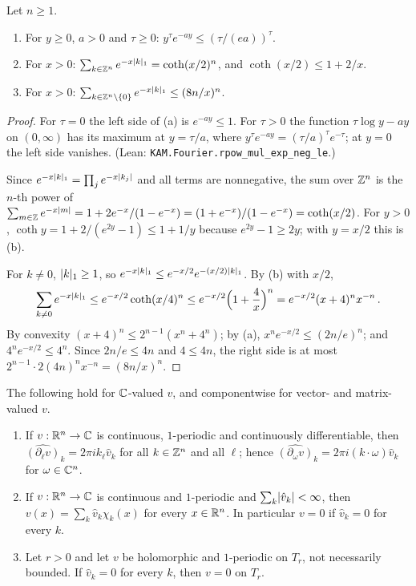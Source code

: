 \begin{lemma}\label{bp:p1:exp-sums}
Let $n\ge1$.
\begin{enumerate}[label=(\alph*)]
\item For $y\ge0$, $a>0$ and $\tau\ge0$: $y^\tau e^{-ay}\le(\tau/(ea))^\tau$.
\item For $x>0$: $\sum_{k\in\mathbb{Z}^n}e^{-x\lvert k\rvert_1}=\coth(x/2)^n$, and $\coth(x/2)\le1+2/x$.
\item For $x>0$: $\sum_{k\in\mathbb{Z}^n\setminus\{0\}}e^{-x\lvert k\rvert_1}\le(8n/x)^n$.
\end{enumerate}
\end{lemma}

\begin{proof}
\label{step:p1:es-power}
For $\tau=0$ the left side of (a) is $e^{-ay}\le1$. For $\tau>0$ the function $\tau\log y-ay$ on
$(0,\infty)$ has its maximum at $y=\tau/a$, where $y^\tau e^{-ay}=(\tau/a)^\tau e^{-\tau}$; at $y=0$ the left
side vanishes. (Lean: \nolinkurl{KAM.Fourier.rpow_mul_exp_neg_le}.)

\label{step:p1:es-product}
Since $e^{-x\lvert k\rvert_1}=\prod_je^{-x\lvert k_j\rvert}$ and all terms are nonnegative, the sum over $\mathbb{Z}^n$ is the
$n$-th power of $\sum_{m\in\mathbb{Z}}e^{-x\lvert m\rvert}=1+2e^{-x}/(1-e^{-x})=(1+e^{-x})/(1-e^{-x})=\coth(x/2)$.
For $y>0$, $\coth y=1+2/(e^{2y}-1)\le1+1/y$ because $e^{2y}-1\ge2y$; with $y=x/2$ this is (b).

\label{step:p1:es-nonzero}
For $k\ne0$, $\lvert k\rvert_1\ge1$, so $e^{-x\lvert k\rvert_1}\le e^{-x/2}e^{-(x/2)\lvert k\rvert_1}$. By (b) with $x/2$,
\begin{equation*}
\sum_{k\ne0}e^{-x\lvert k\rvert_1}\le e^{-x/2}\coth(x/4)^n\le e^{-x/2}\Bigl(1+\frac4x\Bigr)^n
=e^{-x/2}(x+4)^nx^{-n}\,.
\end{equation*}
By convexity $(x+4)^n\le2^{n-1}(x^n+4^n)$; by (a), $x^ne^{-x/2}\le(2n/e)^n$; and $4^ne^{-x/2}\le4^n$.
Since $2n/e\le4n$ and $4\le4n$, the right side is at most $2^{n-1}\cdot2(4n)^nx^{-n}=(8n/x)^n$.
\end{proof}

\begin{lemma}\label{bp:p1:fourier-basic}
The following hold for $\mathbb{C}$-valued $v$, and componentwise for vector- and matrix-valued $v$.
\begin{enumerate}[label=(\alph*)]
\item If $v:\mathbb{R}^n\to\mathbb{C}$ is continuous, $1$-periodic and continuously differentiable, then
  $\widehat{(\partial_\ell v)}_k=2\pi ik_\ell\hat v_k$ for all $k\in\mathbb{Z}^n$ and all $\ell$; hence
  $\widehat{(\partial_\omega v)}_k=2\pi i(k\cdot\omega)\hat v_k$ for $\omega\in\mathbb{C}^n$.
\item If $v:\mathbb{R}^n\to\mathbb{C}$ is continuous and $1$-periodic and $\sum_k\lvert \hat v_k\rvert<\infty$, then
  $v(x)=\sum_k\hat v_k\chi_k(x)$ for every $x\in\mathbb{R}^n$. In particular $v=0$ if $\hat v_k=0$ for every $k$.
\item Let $r>0$ and let $v$ be holomorphic and $1$-periodic on $T_r$, not necessarily bounded. If
  $\hat v_k=0$ for every $k$, then $v=0$ on $T_r$.
\end{enumerate}
\end{lemma}

